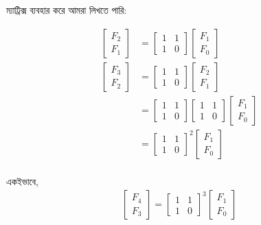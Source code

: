 ম্যাট্রিক্স ব্যবহার করে আমরা লিখতে পারি:

\begin{align*}
\begin{bmatrix} F _2 \\ F_1 \end{bmatrix} &= \begin{bmatrix} 1 & 1 \\ 1 & 0 \end{bmatrix} \begin{bmatrix} F_1 \\ F_0 \end{bmatrix} \\
\begin{bmatrix} F _3 \\ F_2 \end{bmatrix} &= \begin{bmatrix} 1 & 1 \\ 1 & 0 \end{bmatrix} \begin{bmatrix} F_2 \\ F_1 \end{bmatrix} \\
&= \begin{bmatrix} 1 & 1 \\ 1 & 0 \end{bmatrix} \begin{bmatrix} 1 & 1 \\ 1 & 0 \end{bmatrix} \begin{bmatrix} F_1 \\ F_0 \end{bmatrix} \\
&= \begin{bmatrix} 1 & 1 \\ 1 & 0 \end{bmatrix}^2 \begin{bmatrix} F_1 \\ F_0 \end{bmatrix} \\
\end{align*}

একইভাবে,
\begin{align*}
\begin{bmatrix} F _4 \\ F_3 \end{bmatrix} = \begin{bmatrix} 1 & 1 \\ 1 & 0 \end{bmatrix}^3 \begin{bmatrix} F_1 \\ F_0 \end{bmatrix} \\
\end{align*}

